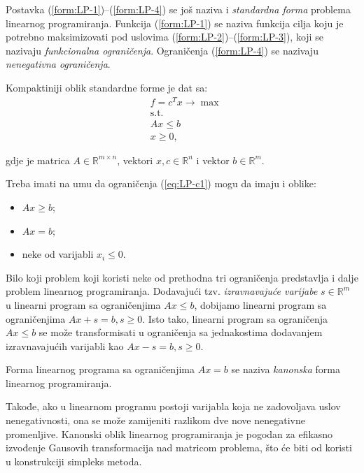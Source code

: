 \documentclass[a4paper, utf8, 11pt, colorlinks]{book}
\begin{document}
Postavka (\ref{form:LP-1})--(\ref{form:LP-4}) se još naziva i \emph{standardna forma} problema linearnog programiranja. Funkcija (\ref{form:LP-1}) se naziva funkcija cilja koju je potrebno maksimizovati pod uslovima (\ref{form:LP-2})--(\ref{form:LP-3}), koji se nazivaju \emph{funkcionalna ograničenja}. Ograničenja (\ref{form:LP-4}) se nazivaju \emph{nenegativna ograničenja}. 

Kompaktiniji oblik standardne forme je dat sa:
\begin{align}
    & f = c^T x \rightarrow \max \label{eq:LP-o1}\\
    & \mbox{s.t.} \nonumber \\
    &  A x \leq b \label{eq:LP-c1} \\
    & x \geq 0 \label{eq:LP-c2},
\end{align}

gdje je matrica $A \in \mathbb{R}^{m \times n}$, vektori  $x,c \in \mathbb{R}^n$ i vektor $b \in \mathbb{R}^{m}$.

Treba imati na umu da ograničenja (\ref{eq:LP-c1}) mogu da imaju i oblike:
\begin{itemize}
    \item $Ax \geq b$;
    \item $Ax = b$;
    \item neke od varijabli $x_i\leqslant 0$.
\end{itemize}
Bilo koji problem koji koristi neke od prethodna tri ograničenja predstavlja i dalje problem linearnog programiranja. Dodavajući tzv. \emph{izravnavajuće varijabe} $s \in \mathbb{R}^m$ u linearni program sa ograničenjima $Ax \leq b$, dobijamo linearni program sa ograničenjima $Ax + s = b, s \geq 0$. Isto tako, linearni program sa ograničenja $Ax \leq b$ se može transformisati u ograničenja sa jednakostima dodavanjem izravnavajućih varijabli kao $Ax - s = b, s\geq 0$.

 Forma linearnog programa sa ograničenjima $Ax = b$ se naziva \emph{kanonska} forma linearnog programiranja. 
 
 Takođe, ako u linearnom
programu postoji varijabla koja ne zadovoljava uslov nenegativnosti, ona se može zamijeniti razlikom dve nove nenegativne promenljive. Kanonski oblik linearnog programiranja je pogodan za efikasno izvođenje Gausovih transformacija  nad matricom problema, što će biti od koristi u konstrukciji simpleks metoda.   %
\end{document}
